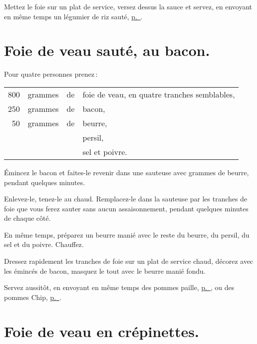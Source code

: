 Mettez le foie sur un plat de service, versez dessus la sauce et servez, en
envoyant en même temps un légumier de riz sauté,
\hyperlink{p0710}{p. \pageref{pg0710}}.

\section*{\centering Foie de veau sauté, au bacon.}
{}

Pour quatre personnes prenez :

\medskip

\footnotesize
\begin{longtable}{rrrp{18em}}
    800 & grammes & de & foie de veau, en quatre tranches semblables,                                     \\
    250 & grammes & de & bacon,                                                                           \\
     50 & grammes & de & beurre,                                                                          \\
        &         &    & persil,                                                                          \\
        &         &    & sel et poivre.                                                                   \\
\end{longtable}
\normalsize

Émincez le bacon et faites-le revenir dans une sauteuse avec {\mmm}
grammes de beurre, pendant quelques minutes.

Enlevez-le, tenez-le au chaud. Remplacez-le dans la sauteuse par les tranches de
foie que vous ferez sauter sans aucun assaisonnement, pendant quelques minutes
de chaque côté.

En même temps, préparez un beurre manié avec le reste du beurre, du persil, du
sel et du poivre. Chauffez.

Dressez rapidement les tranches de foie sur un plat de service chaud, décorez
avec les émincés de bacon, masquez le tout avec le beurre manié fondu.

Servez aussitôt, en envoyant en même temps des pommes paille,
\hyperlink{p0714}{p. \pageref{pg0714}}, ou des pommes Chip,
\hyperlink{p0715-2}{p. \pageref{pg0715-2}}.

\section*{\centering Foie de veau en crépinettes.}
{}

